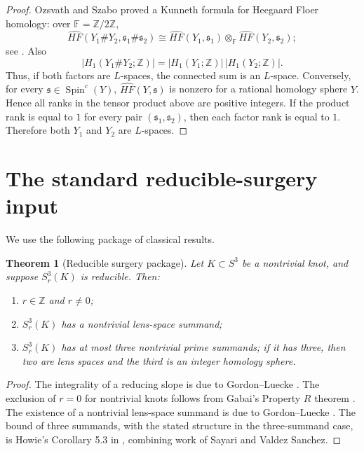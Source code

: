 \documentclass[11pt]{article}
\newtheorem{theorem}{Theorem}[section]
\theoremstyle{definition}
\theoremstyle{remark}
\newcommand{\Z}{\mathbb Z}
\newcommand{\F}{\mathbb F}
\newcommand{\Spin}{\operatorname{Spin}^{c}}
\newcommand{\HFhat}{\widehat{HF}}
\begin{document}
\begin{proof}
Ozsvath and Szabo proved a Kunneth formula for Heegaard Floer homology:
over \(\F=\Z/2\Z\),
\[
 \HFhat(Y_{1}\#Y_{2},\mathfrak s_{1}\#\mathfrak s_{2})
 \cong
 \HFhat(Y_{1},\mathfrak s_{1})\otimes_{\F}
 \HFhat(Y_{2},\mathfrak s_{2});
\]
see \cite[Theorem 1.5]{OSClosed}.  Also
\[
 |H_{1}(Y_{1}\#Y_{2};\Z)|
 =
 |H_{1}(Y_{1};\Z)|\,|H_{1}(Y_{2};\Z)|.
\]
Thus, if both factors are \(L\)-spaces, the connected sum is an \(L\)-space.
Conversely, for every \(\mathfrak s\in\Spin(Y)\), \(\HFhat(Y,\mathfrak s)\)
is nonzero for a rational homology sphere \(Y\).  Hence all ranks in the
tensor product above are positive integers.  If the product rank is equal to
\(1\) for every pair \((\mathfrak s_{1},\mathfrak s_{2})\), then each factor
rank is equal to \(1\).  Therefore both \(Y_{1}\) and \(Y_{2}\) are
\(L\)-spaces.
\end{proof}

\section{The standard reducible-surgery input}

We use the following package of classical results.

\begin{theorem}[Reducible surgery package]\label{thm:package}
Let \(K\subset S^{3}\) be a nontrivial knot, and suppose \(S^{3}_{r}(K)\) is
reducible.  Then:
\begin{enumerate}[label=(\roman*)]
\item \(r\in \Z\) and \(r\neq 0\);
\item \(S^{3}_{r}(K)\) has a nontrivial lens-space summand;
\item \(S^{3}_{r}(K)\) has at most three nontrivial prime summands; if it has
three, then two are lens spaces and the third is an integer homology sphere.
\end{enumerate}
\end{theorem}

\begin{proof}
The integrality of a reducing slope is due to Gordon--Luecke
\cite{GLIntegral}.  The exclusion of \(r=0\) for nontrivial knots follows from
Gabai's Property \(R\) theorem \cite{Gabai}.  The existence of a nontrivial
lens-space summand is due to Gordon--Luecke \cite{GLReducible}.  The bound of
three summands, with the stated structure in the three-summand case, is
Howie's Corollary 5.3 in \cite{HowieSW}, combining work of Sayari and Valdez
Sanchez.
\end{proof}
\end{document}
